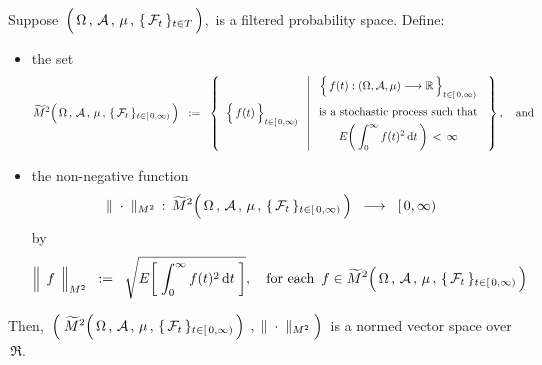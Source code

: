 \vskip 0.5cm
\begin{proposition}[\,$\widetilde{M}^{2}\!
		\left(\,
			\overset{{\color{white}.}}{\Omega} \,,\, \mathcal{A} \,,\, \mu \,,\, \{\,\mathcal{F}_{t}\,\}_{t \in [\,0,\infty)}
			\,\right)$\, is a normed vector space\,]
\label{MTwoTildeIsNormedVectorSpace}
\mbox{}
\vskip 0.2cm
\noindent
Suppose
\,$\left(\,\overset{{\color{white}.}}{\Omega} \,,\, \mathcal{A} \,,\, \mu \,,\, \{\,\mathcal{F}_{t}\,\}_{t \in T} \,\right)$,\,
is a filtered probability space.
Define:
\begin{itemize}
\item
	the set
	\begin{equation*}
	\widetilde{M}^{2}\!
		\left(\,
			\overset{{\color{white}.}}{\Omega} \,,\, \mathcal{A} \,,\, \mu \,,\, \{\,\mathcal{F}_{t}\,\}_{t \in [\,0,\infty)}
			\,\right)
	\;\; := \;\;
		\left\{\;\;
			\left\{\,\overset{{\color{white}.}}{f(t)}\,\right\}_{t\in[\,0,\infty)}
			\;\;\left\vert\;
			\begin{array}{c}
				\left\{\,f(t) : (\Omega,\mathcal{A},\mu) \overset{{\color{white}1}}{\longrightarrow} \Re\,\right\}_{t\in[\,0,\infty)}
				\\
				\overset{{\color{white}1}}{\textnormal{is a stochastic process such that}}
				\\
				\overset{{\color{white}.}}{E\!\left(\,\displaystyle\int_{0}^{\infty} f(t)^{2}\,\d t\,\right) \,<\, \infty}
			\end{array}
			\right.\;\right\},
		\quad
		\textnormal{and}
	\end{equation*}

\item
	the non-negative function
	\begin{equation*}
	\Vert\;\cdot\;\Vert_{M^{2}} \,:\,
	\widetilde{M}^{2}\!
		\left(\,
			\overset{{\color{white}.}}{\Omega} \,,\, \mathcal{A} \,,\, \mu \,,\, \{\,\mathcal{F}_{t}\,\}_{t \in [\,0,\infty)}
			\,\right)
	\;\; \longrightarrow \;\;
	[\,0,\infty)
	\end{equation*}
	by
	\begin{equation*}
	\left\Vert\;\, \overset{{\color{white}}}{f} \,\;\right\Vert_{M^{2}}
	\;\; := \;\;
		\sqrt{E\!\left[\;
			\int_{0}^{\infty} f(t)^{2} \,\d t
			\;\right]},
	\quad
	\textnormal{for each \,$f \in \widetilde{M}^{2}\!
			\left(\,
				\overset{{\color{white}.}}{\Omega} \,,\, \mathcal{A} \,,\, \mu \,,\, \{\,\mathcal{F}_{t}\,\}_{t \in [\,0,\infty)}
				\,\right)$}
	\end{equation*}

\end{itemize}
Then,
\,$\left(\;
	\widetilde{M}^{2}\!
		\left(\,
			\overset{{\color{white}.}}{\Omega} \,,\, \mathcal{A} \,,\, \mu \,,\, \{\,\mathcal{F}_{t}\,\}_{t \in [\,0,\infty)}
			\,\right)
	\;,\;
	\Vert\;\cdot\;\Vert_{M^{2}}
	\;\right)$\,
is a normed vector space over \,$\Re$.
\end{proposition}
